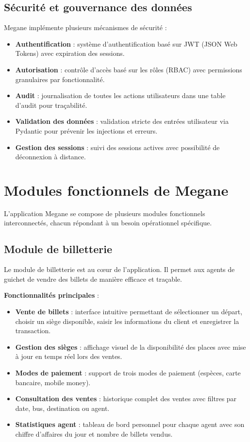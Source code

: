 \documentclass[a4paper, 12pt]{book}
\begin{document}
\subsection{Sécurité et gouvernance des données}

Megane implémente plusieurs mécanismes de sécurité :

\begin{itemize}
    \item \textbf{Authentification} : système d'authentification basé sur JWT (JSON Web Tokens) avec expiration des sessions.
    \item \textbf{Autorisation} : contrôle d'accès basé sur les rôles (RBAC) avec permissions granulaires par fonctionnalité.
    \item \textbf{Audit} : journalisation de toutes les actions utilisateurs dans une table d'audit pour traçabilité.
    \item \textbf{Validation des données} : validation stricte des entrées utilisateur via Pydantic pour prévenir les injections et erreurs.
    \item \textbf{Gestion des sessions} : suivi des sessions actives avec possibilité de déconnexion à distance.
\end{itemize}

\section{Modules fonctionnels de Megane}

L'application Megane se compose de plusieurs modules fonctionnels interconnectés, chacun répondant à un besoin opérationnel spécifique.

\subsection{Module de billetterie}

Le module de billetterie est au cœur de l'application. Il permet aux agents de guichet de vendre des billets de manière efficace et traçable.

\textbf{Fonctionnalités principales} :
\begin{itemize}
    \item \textbf{Vente de billets} : interface intuitive permettant de sélectionner un départ, choisir un siège disponible, saisir les informations du client et enregistrer la transaction.
    \item \textbf{Gestion des sièges} : affichage visuel de la disponibilité des places avec mise à jour en temps réel lors des ventes.
    \item \textbf{Modes de paiement} : support de trois modes de paiement (espèces, carte bancaire, mobile money).
    \item \textbf{Consultation des ventes} : historique complet des ventes avec filtres par date, bus, destination ou agent.
    \item \textbf{Statistiques agent} : tableau de bord personnel pour chaque agent avec son chiffre d'affaires du jour et nombre de billets vendus.
\end{itemize}
\end{document}
